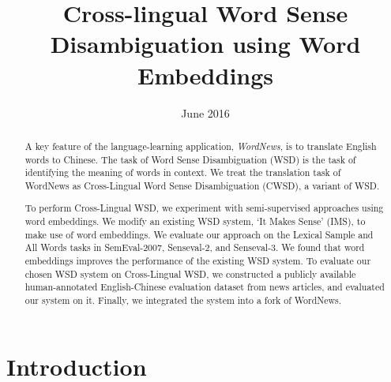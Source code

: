 \documentclass[11pt]{article}
\title{Cross-lingual Word Sense Disambiguation using Word Embeddings}
\date{June 2016}
\begin{document}
\maketitle
\begin{abstract}
  A key feature of the language-learning application, {\it WordNews}, is to 
  translate English words to Chinese. The task of Word Sense Disambiguation 
  (WSD) is the task of identifying the meaning of words in context. We treat 
  the translation task of WordNews as Cross-Lingual Word Sense Disambiguation (CWSD), 
  a variant of WSD.
  
  To perform Cross-Lingual WSD, we experiment with semi-supervised approaches using word embeddings. 
  We modify an existing WSD system, 
`It Makes Sense' (IMS), 
to make use of word embeddings. 
We evaluate our approach on the Lexical Sample and All Words tasks in SemEval-2007, Senseval-2, and Senseval-3. We found that word embeddings improves the performance of the existing WSD system. 
  To evaluate our chosen WSD system on Cross-Lingual WSD, we constructed a publicly available human-annotated English-Chinese evaluation dataset from
news articles, and evaluated our system on it.
Finally, we integrated the system into a fork of WordNews.
\end{abstract}

\section{Introduction}
\label{intro}

%
% 
\end{document}

